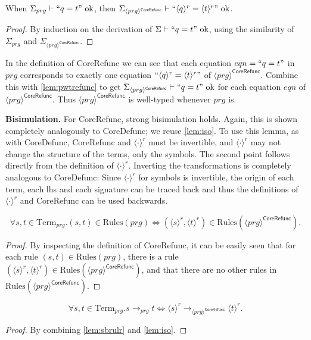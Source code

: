 \begin{lemma}
\label{lem:pwtrefunc}
When $\Sigma_{prg} \vdash `` q = t " \textrm{ ok}$, then $\Sigma_{\langle prg \rangle^{\textsf{CoreRefunc}}} \vdash `` \langle q \rangle^r = \langle t \rangle^r " \textrm{ ok}$.
\begin{proof}
By induction on the derivation of $\Sigma \vdash `` q = t " \textrm{ ok}$, using the similarity of $\Sigma_{prg}$ and $\Sigma_{\langle prg \rangle^{\textsf{CoreRefunc}}}$.
\end{proof}
\end{lemma}

In the definition of \textsf{CoreRefunc} we can see that each equation $eqn = `` q = t "$ in $prg$ corresponds to exactly one equation $`` \langle q \rangle^r = \langle t \rangle^r "$ of $\langle prg \rangle^{\textsf{CoreRefunc}}$. Combine this with \autoref{lem:pwtrefunc} to get $\Sigma_{\langle prg \rangle^{\textsf{CoreRefunc}}} \vdash `` q = t " \textrm{ ok}$ for each equation $eqn$ of $\langle prg \rangle^{\textsf{CoreRefunc}}$. Thus $\langle prg \rangle^{\textsf{CoreRefunc}}$ is well-typed whenever $prg$ is.

\textbf{Bisimulation.} For \textsf{CoreRefunc}, strong bisimulation holds. Again, this is shown completely analogously to \textsf{CoreDefunc}; we reuse \autoref{lem:iso}. To use this lemma, as with \textsf{CoreDefunc}, \textsf{CoreRefunc} and $\langle \cdot \rangle^r$ must be invertible, and $\langle \cdot \rangle^r$ may not change the structure of the terms, only the symbols. The second point follows directly from the definition of $\langle \cdot \rangle^r$. Inverting the transformations is completely analogous to \textsf{CoreDefunc}: Since $\langle \cdot \rangle^r$ for symbols is invertible, the origin of each term, each lhs and each signature can be traced back and thus the definitions of $\langle \cdot \rangle^r$ and \textsf{CoreRefunc} can be used backwards.

\begin{lemma}
\label{lem:sbrulr}
\[
\forall s,t \in \textrm{Term}_{prg}. (s, t) \in \textrm{Rules}(prg) \iff (\langle s \rangle^r, \langle t \rangle^r) \in \textrm{Rules}(\langle prg \rangle^{\textsf{CoreRefunc}}).
\]
\begin{proof}
By inspecting the definition of \textsf{CoreRefunc}, it can be easily seen that for each rule $(s, t) \in \textrm{Rules}(prg)$, there is a rule $(\langle s \rangle^r, \langle t \rangle^r) \in \textrm{Rules}(\langle prg \rangle^{\textsf{CoreRefunc}})$, and that there are no other rules in $\textrm{Rules}(\langle prg \rangle^{\textsf{CoreRefunc}})$.
\end{proof}
\end{lemma}

\begin{corollary}
\[
\forall s,t \in \textrm{Term}_{prg}. s \longrightarrow_{prg} t \iff \langle s \rangle^r \longrightarrow_{\langle prg \rangle^{\textsf{CoreRefunc}}} \langle t \rangle^r.
\]
\begin{proof}
By combining \autoref{lem:sbrulr} and \autoref{lem:iso}.
\end{proof}
\end{corollary}
